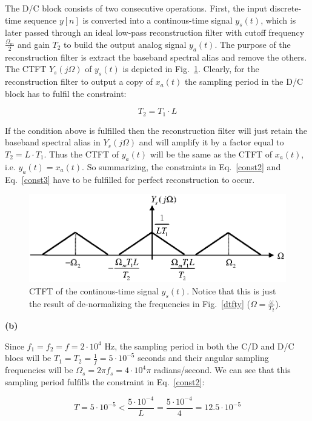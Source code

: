 \documentclass[a4paper,11pt,oneside]{article}
\begin{document}
The D/C block consists of two consecutive operations. First, the input discrete-time sequence $y[n]$ is converted into a continous-time signal $y_s(t)$, which is later passed through an ideal low-pass reconstruction filter with cutoff frequency $\frac{\Omega_m}{2}$ and gain $T_2$ to build the output analog signal $y_a(t)$. The purpose of the reconstruction filter is extract the baseband spectral alias and remove the others. The CTFT $Y_s(j\Omega)$ of $y_s(t)$ is depicted in Fig.~\ref{ctftys}. Clearly, for the reconstruction filter to output a copy of $x_{a}(t)$ the sampling period in the D/C block has to fulfil the constraint: 

\begin{equation}\label{const3}
T_2=T_1\cdot L
\end{equation}

If the condition above is fulfilled then the reconstruction filter will just retain the baseband spectral alias in $Y_s(j\Omega)$ and will amplify it by a factor equal to $T_2=L\cdot T_1$. Thus the CTFT of $y_a(t)$ will be the same as the CTFT of $x_a(t)$, i.e. $y_a(t)=x_a(t)$. So summarizing, the constraints in Eq.~\ref{const2} and Eq.~\ref{const3} have to be fulfilled for perfect reconstruction to occur.

\begin{figure}[h!]
\centering
\includegraphics[width=.8\textwidth]{ctftys.eps}
\caption{CTFT of the continous-time signal $y_s(t)$. Notice that this is just the result of de-normalizing the frequencies in Fig.~\ref{dtfty} ($\Omega=\frac{\omega}{T_2}$).}
\label{ctftys}
\end{figure}


\vspace{1cm}
\textbf{(b)}

Since $f_1=f_2=f=2\cdot 10^4$ Hz, the sampling period in both the C/D and D/C blocs will be $T_1=T_2=\frac{1}{f}=5\cdot 10^{-5}$ seconds and their angular sampling frequencies will be $\Omega_s=2\pi f_s=4\cdot 10^{4}\pi$ radians/second. We can see that this sampling period fulfills the constraint in Eq.~\ref{const2}:

\[
T=5\cdot 10^{-5}<\frac{5\cdot 10^{-4}}{L}=\frac{5\cdot 10^{-4}}{4}=12.5\cdot 10^{-5}
\]
\end{document}
